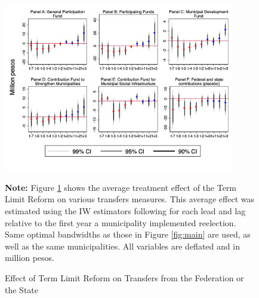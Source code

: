 \documentclass[12pt]{amsart}
\numberwithin{equation}{section}
\theoremstyle{definition}
\theoremstyle{definition}
\theoremstyle{definition}
\begin{document}
 \begin{figure}[h]   
\centering
 \caption{Effect of Term Limit Reform on Transfers from the Federation or the State}
 \label{fig:resources2}
\includegraphics[width=0.9\textwidth]{Figures_incumbency/resouce_based_incumbency_allyears.png}
       \captionsetup{justification=centering}
         
 \textbf{Note:} Figure \ref{fig:resources2} shows the average treatment effect of the Term Limit Reform on various transfers measures. This average effect was estimated using the IW estimators following \citet{abraham_sun_2020} for each lead and lag relative to the first year a municipality implemented reelection. Same optimal bandwidths as those in Figure \ref{fig:main} are used, as well as the same municipalities. All variables are deflated and in million pesos.   
       
\end{figure}  
\end{document}
